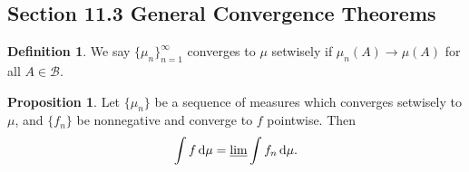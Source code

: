 \documentclass[12pt]{article}
\newcommand{\B}{\mathcal{B}}
\newcommand{\dif}{\, \mathrm{d}}
\theoremstyle{definition}
\newtheorem*{definition}{Definition}
\newtheorem*{prop}{Proposition}
\begin{document}
\subsection*{Section 11.3 General Convergence Theorems}

\begin{definition}
  We say \( \{\mu_{n}\}_{n=1}^{\infty} \) converges to \( \mu \) setwisely if \( \mu_n(A) \to \mu(A) \) for all \( A \in \B \).
\end{definition}

\begin{prop}
  
  Let \( \{\mu_n\} \) be a sequence of measures which converges setwisely to \( \mu \), and \( \{f_n\} \) be nonnegative and converge to \( f \) pointwise. Then
    \[
        \int f \dif \mu = \varliminf \int f_n \dif \mu.
    \]
\end{prop}
\end{document}
